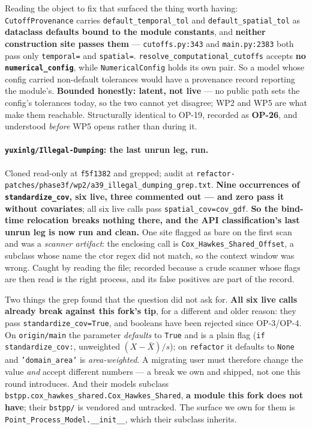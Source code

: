 \documentclass[
  10pt,
]{article}
\begin{document}
Reading the object to fix that surfaced the thing worth having: \texttt{CutoffProvenance} carries \texttt{default\_temporal\_tol} and \texttt{default\_spatial\_tol} as \textbf{dataclass defaults bound to the module constants}, and \textbf{neither construction site passes them} --- \texttt{cutoffs.py:343} and \texttt{main.py:2383} both pass only \texttt{temporal=} and \texttt{spatial=}. \texttt{resolve\_computational\_cutoffs} accepts \textbf{no \texttt{numerical\_config}}, while \texttt{NumericalConfig} holds its own pair. So a model whose config carried non-default tolerances would have a provenance record reporting the module's. \textbf{Bounded honestly: latent, not live} --- no public path sets the config's tolerances today, so the two cannot yet disagree; WP2 and WP5 are what make them reachable. Structurally identical to OP-19, recorded as \textbf{OP-26}, and understood \emph{before} WP5 opens rather than during it.

\paragraph{\texttt{yuxinlg/Illegal-Dumping}: the last unrun leg, run.}
Cloned read-only at \texttt{f5f1382} and grepped; audit at \texttt{refactor-patches/\allowbreak{}phase3f/wp2/\allowbreak{}a39\_illegal\_dumping\_grep.txt}. \textbf{Nine occurrences of \texttt{standardize\_cov}, six live, three commented out --- and \textbf{zero} pass it without covariates}; all six live calls pass \texttt{spatial\_cov=cov\_gdf}. \textbf{So the bind-time relocation breaks nothing there, and the API classification's last unrun leg is now run and clean.} One site flagged as bare on the first scan and was a \emph{scanner artifact}: the enclosing call is \texttt{Cox\_Hawkes\_Shared\_Offset}, a subclass whose name the ctor regex did not match, so the context window was wrong. Caught by reading the file; recorded because a crude scanner whose flags are then read is the right process, and its false positives are part of the record.

Two things the grep found that the question did not ask for. \textbf{All six live calls already break against this fork's tip}, for a different and older reason: they pass \texttt{standardize\_cov=True}, and booleans have been rejected since OP-3/OP-4. On \texttt{origin/main} the parameter \emph{defaults} to \texttt{True} and is a plain flag (\texttt{if standardize\_cov:}, unweighted \((X-\bar X)/s\)); on \texttt{refactor} it defaults to \texttt{None} and \texttt{'domain\_area'} is \emph{area-weighted}. A migrating user must therefore change the value \emph{and} accept different numbers --- a break we own and shipped, not one this round introduces. And their models subclass \texttt{bstpp.cox\_hawkes\_shared.Cox\_Hawkes\_Shared}, \textbf{a module this fork does not have}; their \texttt{bstpp/} is vendored and untracked. The surface we own for them is \texttt{Point\_Process\_Model.\_\_init\_\_}, which their subclass inherits.
\end{document}
